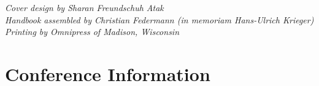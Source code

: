 \documentclass[twoside,makeidx]{book}
\begin{document}

\fancyfoot[C]{}


\thispagestyle{empty}
\vspace*{6in}
\noindent\emph{Cover design by Sharan Freundschuh Atak}\\
\noindent\emph{Handbook assembled by Christian Federmann (in memoriam Hans-Ulrich Krieger)}\\
\emph{Printing by Omnipress of Madison, Wisconsin}

\newpage
\cleardoublepage
\fancyfoot[C]{\thepage}
\frontmatter

\setcounter{tocdepth}{2}
\tableofcontents
\mainmatter
\pagestyle{fancy}

\chapter{Conference Information}

% 
% 

% 


% 

% 

% 



%

%
\end{document}
